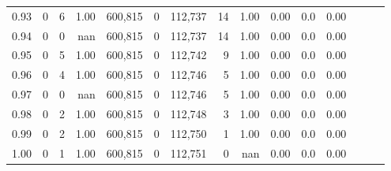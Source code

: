 \begin{tabular}{rrrrrrrrrrrrrrr}
0.93 &       0 &      6 &  1.00 &  600,815 &        0 &  112,737 &       14 &  1.00 &  0.00 &                     0.0 &      0.00 \\
0.94 &       0 &      0 &   nan &  600,815 &        0 &  112,737 &       14 &  1.00 &  0.00 &                     0.0 &      0.00 \\
0.95 &       0 &      5 &  1.00 &  600,815 &        0 &  112,742 &        9 &  1.00 &  0.00 &                     0.0 &      0.00 \\
0.96 &       0 &      4 &  1.00 &  600,815 &        0 &  112,746 &        5 &  1.00 &  0.00 &                     0.0 &      0.00 \\
0.97 &       0 &      0 &   nan &  600,815 &        0 &  112,746 &        5 &  1.00 &  0.00 &                     0.0 &      0.00 \\
0.98 &       0 &      2 &  1.00 &  600,815 &        0 &  112,748 &        3 &  1.00 &  0.00 &                     0.0 &      0.00 \\
0.99 &       0 &      2 &  1.00 &  600,815 &        0 &  112,750 &        1 &  1.00 &  0.00 &                     0.0 &      0.00 \\
1.00 &       0 &      1 &  1.00 &  600,815 &        0 &  112,751 &        0 &   nan &  0.00 &                     0.0 &      0.00 \\
\bottomrule
\end{tabular}
